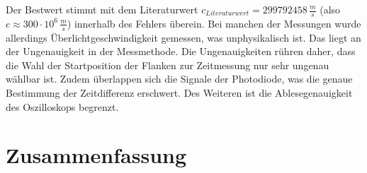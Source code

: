 \documentclass[a4paper,10pt,twocolumn]{scrartcl} %
\begin{document}
	Der Bestwert stimmt mit dem Literaturwert $c_{Literaturwert} = 299792458 \, \frac{m}{s}$ \cite{Lichtgeschwindigkeit} (also $c \approx 300 \cdot 10^{6} \, \frac{m}{s}$)
	innerhalb des Fehlers überein. Bei manchen der Messungen wurde allerdings Überlichtgeschwindigkeit gemessen,
	was unphysikalisch ist. Das liegt an der Ungenauigkeit in der Messmethode.
	{Die Ungenauigkeiten rühren daher, dass die Wahl der Startposition der Flanken zur Zeitmessung nur sehr ungenau wählbar ist.
	Zudem überlappen sich die Signale der Photodiode, was die genaue Bestimmung der Zeitdifferenz erschwert.
	Des Weiteren ist die Ablesegenauigkeit des Oszilloskops begrenzt.}



\section{Zusammenfassung}
\end{document}
